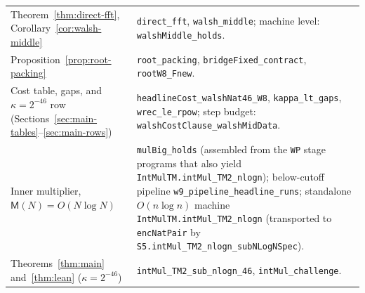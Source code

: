 \begin{table}[ht]
\begin{tabular}{@{}>{\raggedright\arraybackslash}p{5.3cm}>{\raggedright\arraybackslash}p{10.5cm}@{}}
Theorem~\ref{thm:direct-fft}, Corollary~\ref{cor:walsh-middle} &
\texttt{direct\_fft}, \texttt{walsh\_middle}; machine level: \texttt{walshMiddle\_holds}. \\
Proposition~\ref{prop:root-packing} &
\texttt{root\_packing}, \texttt{bridgeFixed\_contract}, \texttt{rootW8\_Fnew}. \\
Cost table, gaps, and $\kappa=2^{-46}$ row (Sections~\ref{sec:main-tables}--\ref{sec:main-rows}) &
\texttt{headlineCost\_walshNat46\_W8}, \texttt{kappa\_lt\_gaps}, \texttt{wrec\_le\_rpow}; step budget: \texttt{walshCostClause\_walshMidData}. \\
Inner multiplier, $\mathsf M(N)=O(N\log N)$ &
\texttt{mulBig\_holds} (assembled from the \texttt{WP} stage programs that also yield \texttt{IntMulTM.\allowbreak intMul\_TM2\_nlogn}); below-cutoff pipeline \texttt{w9\_\allowbreak pipeline\_\allowbreak headline\_\allowbreak runs}; standalone $O(n\log n)$ machine \texttt{IntMulTM.\allowbreak intMul\_TM2\_nlogn} (transported to \texttt{encNatPair} by \texttt{S5.intMul\_\allowbreak TM2\_\allowbreak nlogn\_\allowbreak subNLogNSpec}). \\
Theorems~\ref{thm:main} and~\ref{thm:lean} ($\kappa=2^{-46}$) &
\texttt{intMul\_TM2\_sub\_nlogn\_46}, \texttt{intMul\_challenge}. \\
\bottomrule
\end{tabular}
\end{table}

